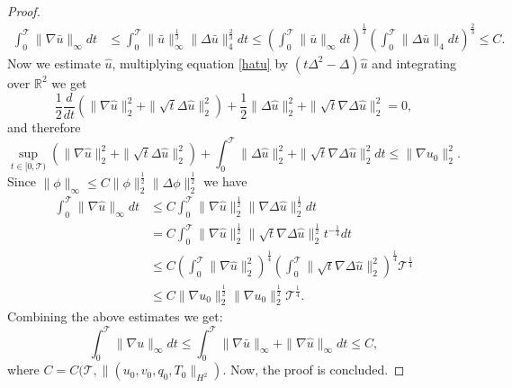 \documentclass[11pt, a4paper, article,reqno,]{amsart}
\theoremstyle{remark}
\numberwithin{equation}{section}
\begin{document}
\begin{proof}
\begin{equation}\label{grad_u_bar_infty}
    \begin{aligned}
        \int_0^\mathcal{T}\|\nabla \bar{u}\|_\infty dt & \leq \int_0^\mathcal{T} \|\bar u\|_\infty^{\frac{1}{3}}\|\Delta \bar u \|_4^{\frac{2}{3}}dt \leq \left(\int_0^\mathcal{T} \|\bar u\|_\infty dt \right)^{\frac{1}{3}} \left( \int_0^\mathcal{T} \|\Delta \bar u\|_4dt \right)^{\frac{2}{3}} \leq  C. 
    \end{aligned}
\end{equation}
Now we estimate $\hat{u}$, multiplying equation \eqref{hatu} by $(t \Delta^2 - \Delta)\hat{u}$ and integrating over $\mathbb{R}^2$ we get
\begin{equation*}
    \frac{1}{2} \frac{d}{dt} ( \|\nabla \hat{u}\|_2^2 + \|\sqrt{t} \Delta \hat{u}\|_2^2) + \frac{1}{2} \|\Delta \hat{u}\|_2^2 + \|\sqrt{t} \nabla \Delta \hat{u}\|_2^2 = 0,
\end{equation*}
and therefore
\begin{equation*}
    \sup_{t \in [0,\mathcal{T})} ( \|\nabla \hat{u}\|_2^2 + \|\sqrt{t} \Delta \hat{u}\|_2^2) + \int_0^\mathcal{T} \|\Delta \hat{u}\|_2^2 + \|\sqrt{t} \nabla \Delta \hat{u}\|_2^2dt \leq \|\nabla u_0\|_2^2.
\end{equation*}
Since $\|\phi\|_\infty \leq C \|\phi\|_2^{\frac{1}{2}} \|\Delta \phi\|_2^{\frac{1}{2}}$ we have
\begin{equation*}
\begin{aligned}
    \int_0^\mathcal{T} \|\nabla \hat{u}\|_\infty dt & \leq C \int_0^\mathcal{T} \|\nabla \hat{u}\|_2^{\frac{1}{2}} \|\nabla \Delta \hat{u}\|_2^{\frac{1}{2}}dt \\
    & = C \int_0^\mathcal{T} \|\nabla \hat{u}\|_2^{\frac{1}{2}} \|\sqrt{t}\nabla \Delta \hat{u}\|_2^{\frac{1}{2}}t^{-\frac{1}{4}}dt \\
    & \leq C \left( \int_0^\mathcal{T} \|\nabla \hat{u}\|_2^2 \right)^{\frac{1}{4}}\left( \int_0^\mathcal{T} \|\sqrt{t}\nabla \Delta \hat{u}\|_2^2\right)^{\frac{1}{4}}\mathcal{T}^{\frac{1}{4}} \\
    &\leq C \|\nabla u_0\|_2^{\frac{1}{2}} \|\nabla u_0\|_2^{\frac{1}{2}} \mathcal{T}^{\frac{1}{4}}.
\end{aligned}
\end{equation*}
Combining the above estimates we get:
\begin{equation}\label{control_nablau}
    \int_0^\mathcal{T} \|\nabla u\|_\infty dt \leq \int_0^\mathcal{T} \|\nabla \bar u \|_\infty  + \|\nabla \hat u\|_\infty dt \leq C, 
\end{equation}
where $C=C(\mathcal{T}, \|(u_0,v_0,q_0,T_{0}\|_{H^2})$. Now, the proof is concluded. 
\end{proof}
\end{document}
